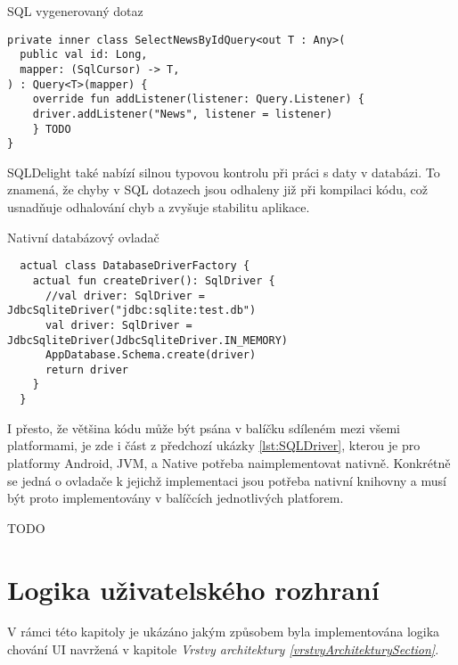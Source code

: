 \begin{listing}
\caption{SQL vygenerovaný dotaz}\label{lst:SQLGeneratedDotaz}
\begin{verbatim}
private inner class SelectNewsByIdQuery<out T : Any>(
  public val id: Long,
  mapper: (SqlCursor) -> T,
) : Query<T>(mapper) {
    override fun addListener(listener: Query.Listener) {
    driver.addListener("News", listener = listener)
    } TODO
}
\end{verbatim}
\end{listing}

SQLDelight také nabízí silnou typovou kontrolu při práci s daty v databázi. To znamená, že chyby v SQL dotazech jsou odhaleny již při
 kompilaci kódu, což usnadňuje odhalování chyb a zvyšuje stabilitu aplikace.

\begin{listing}
\caption{Nativní databázový ovladač}\label{lst:DatabaseDriverFactory}
\begin{verbatim}
  actual class DatabaseDriverFactory {
    actual fun createDriver(): SqlDriver {
      //val driver: SqlDriver = JdbcSqliteDriver("jdbc:sqlite:test.db")
      val driver: SqlDriver = JdbcSqliteDriver(JdbcSqliteDriver.IN_MEMORY)
      AppDatabase.Schema.create(driver)
      return driver
    }
  }
\end{verbatim}
\end{listing}

I přesto, že většina kódu může být psána v balíčku sdíleném mezi všemi platformami, je zde i část z předchozí ukázky \ref{lst:SQLDriver},
kterou je pro platformy Android, JVM, a Native potřeba naimplementovat nativně. Konkrétně se jedná o ovladače k jejichž implementaci jsou 
potřeba nativní knihovny a musí být proto implementovány v balíčcích jednotlivých platforem.

TODO




\section{Logika uživatelského rozhraní} \label{UILayerImpl}
V rámci této kapitoly je ukázáno jakým způsobem byla implementována logika chování UI navržená v kapitole 
\textit{Vrstvy architektury \ref{vrstvyArchitekturySection}}.


